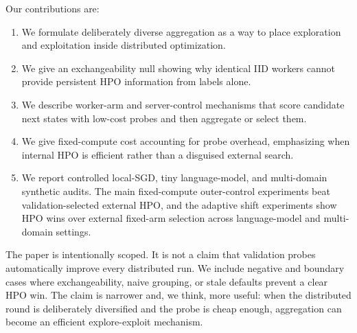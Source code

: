 Our contributions are:

\begin{enumerate}
\item We formulate deliberately diverse aggregation as a way to place
exploration and exploitation inside distributed optimization.
\item We give an exchangeability null showing why identical IID workers cannot
provide persistent HPO information from labels alone.
\item We describe worker-arm and server-control mechanisms that score
candidate next states with low-cost probes and then aggregate or select them.
\item We give fixed-compute cost accounting for probe overhead, emphasizing
when internal HPO is efficient rather than a disguised external search.
\item We report controlled local-SGD, tiny language-model, and multi-domain
synthetic audits. The main fixed-compute outer-control experiments beat
validation-selected external HPO, and the adaptive shift experiments show HPO
wins over external fixed-arm selection across language-model and multi-domain
settings.
\end{enumerate}

The paper is intentionally scoped. It is not a claim that validation probes
automatically improve every distributed run. We include negative and boundary
cases where exchangeability, naive grouping, or stale defaults prevent a clear
HPO win. The claim is narrower and, we think, more useful: when the distributed
round is deliberately diversified and the probe is cheap enough, aggregation
can become an efficient explore-exploit mechanism.
